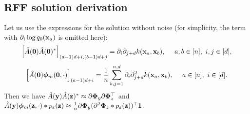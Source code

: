 \subsection{RFF solution derivation}
\label{sec:rff_solution_derivation}
Let us use the expressions for the solution without noise
(for simplicity, the term with $\partial_i \log q_0({\bf x}_a)$ is omitted here):
\begin{equation*}
    \left [ \hat{A}({\bf 0})\hat{A}({\bf 0})^* \right ]_{(a - 1)d + i, (b - 1)d + j} =
    \partial_i\partial_{j + d}k({\bf x}_a, {\bf x}_b),~\quad a, b \in [n],~i, j \in [d],
\end{equation*}
\begin{equation*}
    \left [ \hat{A}({\bf 0}){\bm \phi}_m({\bf 0}, \cdot) \right ]_{(a - 1)d + i} =
    \frac{1}{n}\sum_{b, j = 1}^{n, d}\partial_i\partial^2_{j + d}k({\bf x}_a, {\bf x}_b),~\quad a\in [n],~i \in [d].
\end{equation*}
Then we have
$\hat{A}({\bf y})\hat{A}({\bf z})^* \approx \partial{\bm \Phi}_y\partial{\bm \Phi}_z^{\top}$
and
$\hat{A}({\bf y}){\bm \phi}_m({\bf z}, \cdot) * p_{\varepsilon}({\bf z}) \approx \frac{1}{n}
\partial{\bm \Phi}_y(\partial^2{\bm \Phi}_z * p_{\varepsilon}({\bf z}))^{\top}{\bf 1}$.

